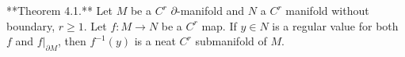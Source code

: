 **Theorem 4.1.** Let $M$ be a $C^r$ $\partial$-manifold and $N$ a $C^r$ manifold without boundary, $r \geq 1$. Let $f: M \to N$ be a $C^r$ map. If $y \in N$ is a regular value for both $f$ and $f|_{\partial M}$, then $f^{-1}(y)$ is a neat $C^r$ submanifold of $M$.

